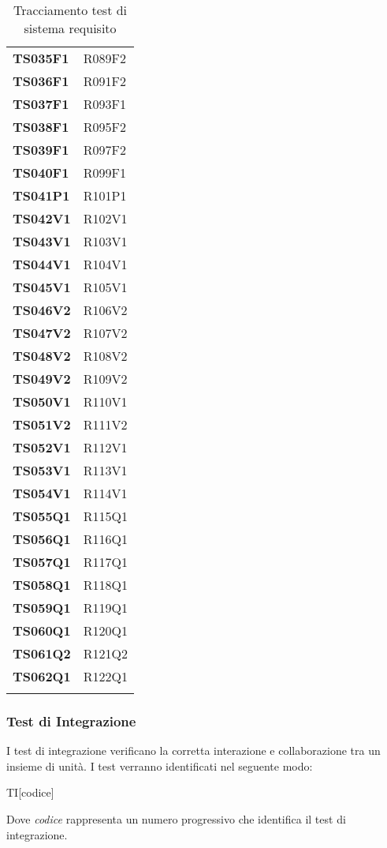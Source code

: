 \documentclass[../piano-di-qualifica.tex]{subfiles}
\begin{document}
\begin{longtable}[H]{>{\centering\bfseries}m{5cm} >{\centering\arraybackslash}m{5cm}}
  TS035F1 & R089F2 \\
  TS036F1 & R091F2 \\
  TS037F1 & R093F1 \\
  TS038F1 & R095F2 \\
  TS039F1 & R097F2 \\
  TS040F1 & R099F1 \\
  TS041P1 & R101P1 \\
  TS042V1 & R102V1 \\
  TS043V1 & R103V1 \\
  TS044V1 & R104V1 \\
  TS045V1 & R105V1 \\
  TS046V2 & R106V2 \\
  TS047V2 & R107V2 \\
  TS048V2 & R108V2 \\
  TS049V2 & R109V2 \\
  TS050V1 & R110V1 \\
  TS051V2 & R111V2 \\
  TS052V1 & R112V1 \\
  TS053V1 & R113V1 \\
  TS054V1 & R114V1 \\
  TS055Q1 & R115Q1 \\
  TS056Q1 & R116Q1 \\
  TS057Q1 & R117Q1 \\
  TS058Q1 & R118Q1 \\
  TS059Q1 & R119Q1 \\
  TS060Q1 & R120Q1 \\
  TS061Q2 & R121Q2 \\
  TS062Q1 & R122Q1 \\


 




  \rowcolor{white}
  \caption{Tracciamento test di sistema \- requisito}%
  \label{tab:test_sistema_requisito}
\end{longtable}



\newpage
\subsubsection{Test di Integrazione}%
\label{subs:test_di_integrazione}

I test di integrazione verificano la corretta interazione e collaborazione tra un insieme di unità. I test verranno identificati nel seguente modo:
\begin{center}
  TI[codice]
\end{center}
Dove \textit{codice} rappresenta un numero progressivo che identifica il test di integrazione.
\end{document}
